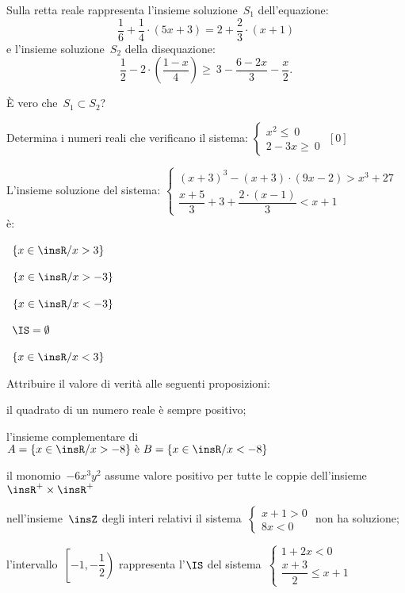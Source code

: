 \begin{esercizio}
 \label{ese:21.33}
Sulla retta reale rappresenta l'insieme soluzione~$S_{1}$
dell'equazione:
\[\dfrac{1}{6}+\dfrac{1}{4}\cdot (5x+3)=2+\dfrac{2}{3}\cdot (x+1)\]
e l'insieme soluzione~$S_{2}$ della disequazione:
\[\dfrac{1}{2}-2\cdot\left(\dfrac{1-x}{4}\right)\ge
~3-\dfrac{6-2x}{3}-\dfrac{x}{2}.\]

È vero che~$S_{1}\subset S_{2}$?
\end{esercizio}

\begin{esercizio}[\Ast]
 \label{ese:21.34}
 Determina i numeri reali che verificano il sistema:
 $\left\{%
  \begin{array}{l}
  x^{2}\le~0
  \\2-3x\ge~0
 \end{array}\right.$
 \hfill $\left[0\right]$
 \end{esercizio}

\begin{esercizio}
 \label{ese:21.35}
 L'insieme soluzione del sistema:
$\left\{\begin{array}{l}
  (x+3)^{3}-(x+3)\cdot (9x-2)>x^{3}+27\\
  \dfrac{x+5}{3}+3+\dfrac{2\cdot (x-1)}{3}<x+1
 \end{array}\right.$ è:
\begin{multicols}{2}
\boxA\quad~$\left\{x\in \insR/x>3\right\}$

\boxB\quad~$\left\{x\in \insR/x>-3\right\}$

\boxC\quad~$\left\{x\in \insR/x<-3\right\}$

\boxD\quad~$\IS=\emptyset $

\boxE\quad~$\left\{x\in\insR/x<3\right\}$
\end{multicols}

\end{esercizio}

\begin{esercizio}
 \label{ese:21.36}
 Attribuire il valore di verità alle seguenti proposizioni:

\begin{enumeratea}
\item il quadrato di un numero reale è sempre positivo;
\item l'insieme complementare di~$A=\{x\in\insR/x>-8\}\text{ è 
}B=\{x\in\insR/x<-8\}$
\item il monomio~$-6x^{3}y^{2}$ assume valore positivo per tutte le coppie 
dell'insieme~$\insR^{+}\times\insR^{+}$
\item nell'insieme~$\insZ$ degli interi relativi il 
sistema~$\left\{\begin{array}{l}x+1>0\\8x<0\end{array}\right.$ non ha soluzione;
\item l'intervallo~$\left[-1,\left.-{\dfrac{1}{2}}\right)\right.$ rappresenta 
l'$\IS$ del sistema~$\left\{\begin{array}{l}1+2x<0 \\\dfrac{x+3}{2}\le 
x+1\end{array}\right.$
\end{enumeratea}
\end{esercizio}

